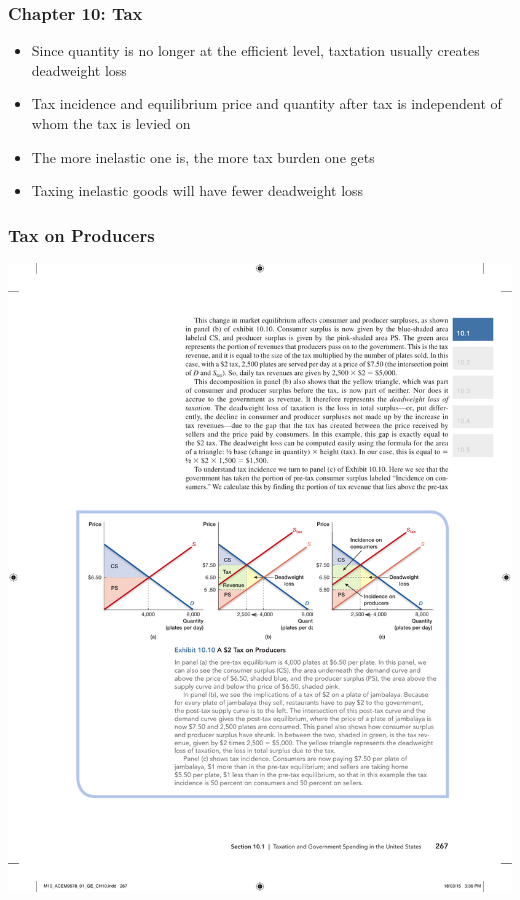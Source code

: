 \documentclass[12pt, xcolor=dvipsnames]{beamer}
\begin{document}
\begin{frame}
\frametitle{\bf Chapter 10: Tax}
\begin{itemize}
\item Since quantity is no longer at the efficient level, taxtation usually creates deadweight loss
\item Tax incidence and equilibrium price and quantity after tax is independent of whom the tax is levied on
\item The more inelastic one is, the more tax burden one gets
\item Taxing inelastic goods will have fewer deadweight loss
\end{itemize}
\end{frame}

\begin{frame}
\frametitle{\bf Tax on Producers}
\begin{center}
\includegraphics[height=.85\textheight]{figures/7.pdf}
\end{center}
\end{frame}
\end{document}
